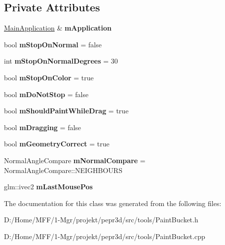 \subsection*{Private Attributes}
\begin{DoxyCompactItemize}
\item 
\mbox{\label{classpepr3d_1_1_paint_bucket_a5756508c517dbec4bb4aeb17fc8acac8}} 
\mbox{\hyperlink{classpepr3d_1_1_main_application}{Main\+Application}} \& {\bfseries m\+Application}
\item 
\mbox{\label{classpepr3d_1_1_paint_bucket_a2d44e37110a6d39bacc8789ad0d2fd6f}} 
bool {\bfseries m\+Stop\+On\+Normal} = false
\item 
\mbox{\label{classpepr3d_1_1_paint_bucket_afc22a30f5702c5b06afe5f0e6d3124a2}} 
int {\bfseries m\+Stop\+On\+Normal\+Degrees} = 30
\item 
\mbox{\label{classpepr3d_1_1_paint_bucket_a7fefc0ec504e248fb0f5ef49687edc6e}} 
bool {\bfseries m\+Stop\+On\+Color} = true
\item 
\mbox{\label{classpepr3d_1_1_paint_bucket_ad28c149c77707dab895d7a2cc29ae713}} 
bool {\bfseries m\+Do\+Not\+Stop} = false
\item 
\mbox{\label{classpepr3d_1_1_paint_bucket_a1797fee17fba3e0f11e977fe9a8fe0a6}} 
bool {\bfseries m\+Should\+Paint\+While\+Drag} = true
\item 
\mbox{\label{classpepr3d_1_1_paint_bucket_ad90734d28f1841f9510908343042d49a}} 
bool {\bfseries m\+Dragging} = false
\item 
\mbox{\label{classpepr3d_1_1_paint_bucket_a0841aa42b8a40150ae4ef8c8620ff837}} 
bool {\bfseries m\+Geometry\+Correct} = true
\item 
\mbox{\label{classpepr3d_1_1_paint_bucket_a25e2b7aabc00a4c0c92e2e113de3298d}} 
Normal\+Angle\+Compare {\bfseries m\+Normal\+Compare} = Normal\+Angle\+Compare\+::\+N\+E\+I\+G\+H\+B\+O\+U\+RS
\item 
\mbox{\label{classpepr3d_1_1_paint_bucket_a76a19ec31e54b1325acdf8290c7e6682}} 
glm\+::ivec2 {\bfseries m\+Last\+Mouse\+Pos}
\end{DoxyCompactItemize}


The documentation for this class was generated from the following files\+:\begin{DoxyCompactItemize}
\item 
D\+:/\+Home/\+M\+F\+F/1-\/\+Mgr/projekt/pepr3d/src/tools/Paint\+Bucket.\+h\item 
D\+:/\+Home/\+M\+F\+F/1-\/\+Mgr/projekt/pepr3d/src/tools/Paint\+Bucket.\+cpp\end{DoxyCompactItemize}
